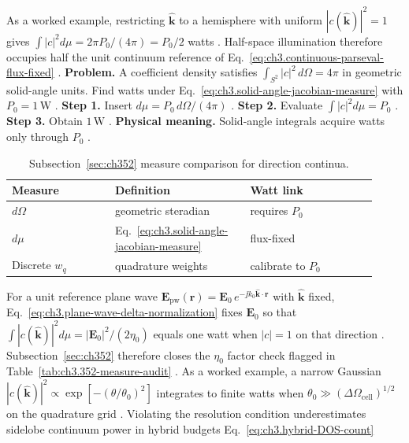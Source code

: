 As a worked example, restricting \(\hat{\mathbf{k}}\) to a hemisphere with uniform \(|c(\hat{\mathbf{k}})|^{2}=1\) gives
\(\int|c|^{2}d\mu=2\pi P_{0}/(4\pi)=P_{0}/2\) watts \cite{jackson1999}. Half-space illumination therefore
occupies half the unit continuum reference of Eq.~\eqref{eq:ch3.continuous-parseval-flux-fixed} \cite{stratton1941}.
\textbf{Problem.} A coefficient density satisfies \(\int_{S^{2}}|c|^{2}\,d\Omega=4\pi\) in geometric solid-angle units.
Find watts under Eq.~\eqref{eq:ch3.solid-angle-jacobian-measure} with \(P_{0}=1\,\mathrm{W}\)
\cite{harrington2001}.
\textbf{Step 1.} Insert \(d\mu=P_{0}\,d\Omega/(4\pi)\) \cite{hansen1988}.
\textbf{Step 2.} Evaluate \(\int|c|^{2}d\mu=P_{0}\) \cite{poynting1884}.
\textbf{Step 3.} Obtain \(1\,\mathrm{W}\) \cite{harrington2001}.
\textbf{Physical meaning.} Solid-angle integrals acquire watts only through \(P_{0}\) \cite{stratton1941}.
\begin{table}[t]
\centering
\caption{Subsection~\ref{sec:ch352} measure comparison for direction continua.}
\label{tab:ch3.352-measure-comparison}
\small
\begin{tabular}{@{}p{0.26\linewidth}p{0.34\linewidth}p{0.32\linewidth}@{}}
\toprule
Measure & Definition & Watt link \\
\midrule
\(d\Omega\) & geometric steradian & requires \(P_{0}\) \\
\(d\mu\) & Eq.~\eqref{eq:ch3.solid-angle-jacobian-measure} & flux-fixed \\
Discrete \(w_{q}\) & quadrature weights & calibrate to \(P_{0}\) \\
\bottomrule
\end{tabular}
\end{table}
For a unit reference plane wave \(\mathbf{E}_{\mathrm{pw}}(\mathbf{r})=\mathbf{E}_{0}\,e^{-\jj k_{0}\hat{\mathbf{k}}\cdot\mathbf{r}}\) with
\(\hat{\mathbf{k}}\) fixed, Eq.~\eqref{eq:ch3.plane-wave-delta-normalization} fixes \(\mathbf{E}_{0}\) so that
\(\int|c(\hat{\mathbf{k}})|^{2}d\mu=|\mathbf{E}_{0}|^{2}/(2\eta_{0})\) equals one watt when \(|c|=1\) on that direction
\cite{jackson1999}. Subsection~\ref{sec:ch352} therefore closes the \(\eta_{0}\) factor check flagged in
Table~\ref{tab:ch3.352-measure-audit} \cite{hansen1988}.
As a worked example, a narrow Gaussian \(|c(\hat{\mathbf{k}})|^{2}\propto\exp[-(\theta/\theta_{0})^{2}]\) integrates to finite watts when
\(\theta_{0}\gg(\Delta\Omega_{\mathrm{cell}})^{1/2}\) on the quadrature grid \cite{harrington2001}. Violating the
resolution condition underestimates sidelobe continuum power in hybrid budgets Eq.~\eqref{eq:ch3.hybrid-DOS-count}
